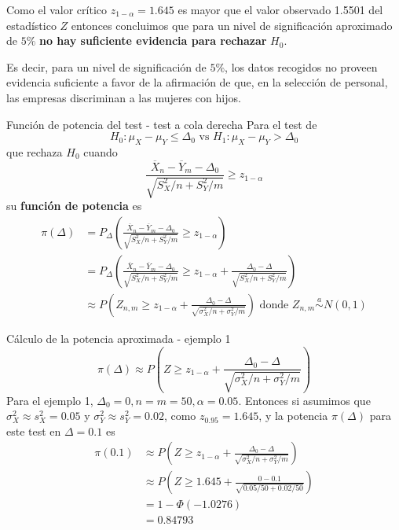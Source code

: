 \documentclass{beamer}
\theoremstyle{definition}
\begin{document}
\begin{frame}
\medskip

Como el valor cr\'itico $z_{1-\alpha}=1.645$ es mayor que el valor observado 1.5501 del estad\'istico $Z$ entonces concluimos que para un nivel de significaci\'on aproximado de $5 \%$\textbf{ no hay suficiente evidencia para rechazar} $H_0$.

\medskip

Es decir, para un nivel de significaci\'on de $5 \%$, los datos recogidos no proveen evidencia suficiente a favor de la afirmaci\'on de que, en la selecci\'on de personal, las empresas discriminan a las mujeres con hijos.
\end{frame}

\begin{frame}{\color{rosee}Funci\'on de potencia del test - test a cola derecha}
\small
Para el test de
$$
H_0: \mu_X-\mu_Y \leq \Delta_0 \text { vs } H_1: \mu_X-\mu_Y>\Delta_0
$$
que rechaza $H_0$ cuando
$$
\frac{\overline{X}_{n}-\overline{Y}_{m}-\Delta_0}{\sqrt{S_X^2 / n+S_Y^2 / m}} \geq z_{1-\alpha}
$$
su \textbf{función de potencia} es
$$
\begin{aligned}
\pi(\Delta) &=P_{\Delta}\left(\frac{\overline{X}_{n}-\overline{Y}_{m}-\Delta_0}{\sqrt{S_X^2 / n+S_Y^2 / m}} \geq z_{1-\alpha}\right) \\
&=P_{\Delta}\left(\frac{\overline{X}_{n}-\overline{Y}_{m}-\Delta_0}{\sqrt{S_X^2 / n+S_Y^2 / m}} \geq z_{1-\alpha}+\frac{\Delta_0-\Delta}{\sqrt{S_X^2 / n+S_Y^2 / m}}\right) \\
& \approx P\left(Z_{n,m} \geq z_{1-\alpha}+\frac{\Delta_0-\Delta}{\sqrt{\sigma_X^2 / n+\sigma_Y^2 / m}}\right) \text { donde } Z_{n,m} \stackrel{a}{\sim} N(0,1)
\end{aligned}
$$
\end{frame}

\begin{frame}{\color{rosee} C\'alculo de la potencia aproximada - ejemplo 1}
\small
$$
\pi(\Delta) \approx P\left(Z \geq z_{1-\alpha}+\frac{\Delta_0-\Delta}{\sqrt{\sigma_X^2 / n+\sigma_Y^2 / m}}\right)
$$
Para el ejemplo 1, $\Delta_0=0, n=m=50, \alpha=0.05$. Entonces si asumimos que $\sigma_X^2 \approx s_X^2=0.05$ y $\sigma_Y^2 \approx s_Y^2=0.02$, como $z_{0.95}=1.645$, y la potencia $\pi(\Delta)$ para este test en $\Delta=0.1$ es
$$
\begin{aligned}
\pi(0.1) & \approx P\left(Z \geq z_{1-\alpha}+\frac{\Delta_0-\Delta}{\sqrt{\sigma_X^2 / n+\sigma_Y^2 / m}}\right) \\
& \approx P\left(Z \geq 1.645+\frac{0-0.1}{\sqrt{0.05 / 50+0.02 / 50}}\right) \\
&=1-\Phi(-1.0276) \\
&=0.84793
\end{aligned}
$$
\end{frame}
\end{document}
